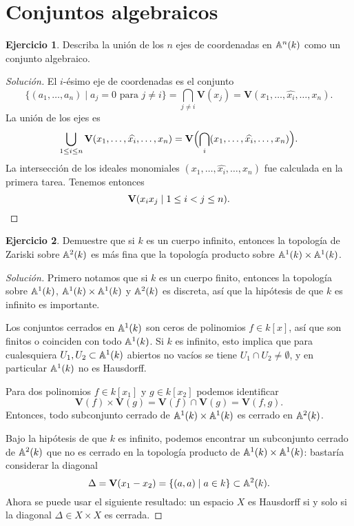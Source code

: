 \documentclass{article}
\theoremstyle{definition}
\newtheorem{ejerc}{Ejercicio}
\newenvironment{solucion}{\begin{proof}[Solución]}{\end{proof}}
\begin{document}
\ifdefined\solutions\pagebreak\fi

\section*{Conjuntos algebraicos}

\begin{ejerc}
  Describa la unión de los $n$ ejes de coordenadas en $\AA^n (k)$ como un
  conjunto algebraico.

  \ifdefined\solutions\begin{solucion}
    El $i$-ésimo eje de coordenadas es el conjunto
    \[ \{ (a_1,\ldots,a_n) \mid a_j = 0 \text{ para }j \ne i \} =
       \bigcap_{j\ne i} \mathbf{V} (x_j) =
       \mathbf{V} (x_1, \ldots, \widehat{x_i}, \ldots, x_n). \]
    La unión de los ejes es
    \[ \bigcup_{1 \le i \le n} \mathbf{V} (x_1, \ldots, \widehat{x_i}, \ldots, x_n) =
       \mathbf{V} \Bigl(\bigcap_i (x_1, \ldots, \widehat{x_i}, \ldots, x_n)\Bigr). \]
    La intersección de los ideales monomiales
    $(x_1, \ldots, \widehat{x_i}, \ldots, x_n)$ fue calculada en la primera
    tarea. Tenemos entonces
    \[ \mathbf{V} (x_i x_j \mid 1 \le i < j \le n). \qedhere \]
  \end{solucion}\fi
\end{ejerc}

\begin{ejerc}
  Demuestre que si $k$ es un cuerpo infinito, entonces la topología de Zariski
  sobre $\AA^2 (k)$ es más fina que la topología producto sobre
  $\AA^1 (k) \times \AA^1 (k)$.

  \ifdefined\solutions\begin{solucion}
    Primero notamos que si $k$ es un cuerpo finito, entonces la topología sobre
    $\AA^1 (k)$, $\AA^1 (k) \times \AA^1 (k)$ y $\AA^2 (k)$ es discreta, así que
    la hipótesis de que $k$ es infinito es importante.

    Los conjuntos cerrados en $\AA^1 (k)$ son ceros de polinomios $f \in k [x]$,
    así que son finitos o coinciden con todo $\AA^1 (k)$. Si $k$ es infinito,
    esto implica que para cualesquiera $U_1, U_2 \subset \AA^1 (k)$ abiertos no
    vacíos se tiene $U_1 \cap U_2 \ne \emptyset$, y en particular $\AA^1 (k)$ no
    es Hausdorff.

    Para dos polinomios $f \in k [x_1]$ y $g \in k [x_2]$ podemos identificar
    \[ \mathbf{V} (f) \times \mathbf{V} (g) =
       \mathbf{V} (f) \cap \mathbf{V} (g) =
       \mathbf{V} (f,g). \]
    Entonces, todo subconjunto cerrado de $\AA^1 (k) \times \AA^1 (k)$ es
    cerrado en $\AA^2 (k)$.

    Bajo la hipótesis de que $k$ es infinito, podemos encontrar un subconjunto
    cerrado de $\AA^2 (k)$ que no es cerrado en la topología producto de
    $\AA^1 (k)\times \AA^1 (k)$: bastaría considerar la diagonal
    $$\Delta = \mathbf{V} (x_1 - x_2) =  \{ (a,a) \mid a \in k \} \subset \AA^2 (k).$$
    Ahora se puede usar el siguiente resultado: un espacio $X$ es Hausdorff si y
    solo si la diagonal $\Delta \in X\times X$ es cerrada.
  \end{solucion}\fi
\end{ejerc}
\end{document}
